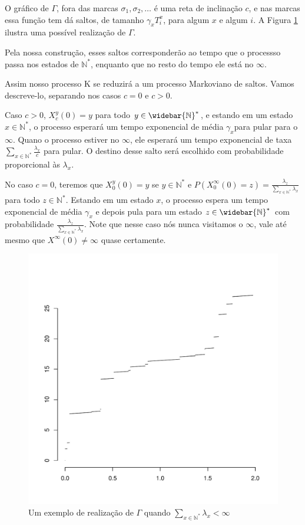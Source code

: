 \documentclass[11pt,twoside,a4paper]{article}
\newcommand{\Nz}{{\mathbb{N^*}}}
\newcommand{\Nzb}{{\mathbb{\widebar{N}^*}}}
\begin{document}
O gráfico de $\Gamma$, fora das marcas $\sigma_1, \sigma_2,
\ldots$ é uma reta de inclinação $c$, e nas marcas
essa função tem dá saltos, de tamanho $\gamma_x T^x_i$, para algum $x$
e algum $i$. A Figura \ref{fig:graf_gamma} ilustra uma possível
realização de $\Gamma$.


Pela nossa construção, esses saltos corresponderão ao tempo que o
processso passa nos estados de $\Nz$, enquanto que no resto do tempo
ele está no $\infty$.

Assim nosso processo K se reduzirá a um processo Markoviano de
saltos. Vamos descreve-lo, separando nos casos $c = 0$ e $c > 0$.

Caso $c > 0$, $X^y_c(0) = y$ para todo $y \in \Nzb$, e estando em um
estado $x \in \Nz$, o processo esperará um tempo exponencial de média
$\gamma_x$para pular para o $\infty$.
Quano o processo estiver no $\infty$, ele esperará um tempo
exponencial de taxa $\sum_{x \in \Nz} \frac{\lambda_x}{c}$ para
pular. O destino desse salto será escolhido com probabilidade
proporcional às $\lambda_x$.

No caso $c=0$, teremos que $X^y_0(0) = y$ se $y \in \Nz$ e
$P(X^\infty_0(0) = z) = \frac{\lambda_z}{\sum_{x\in\Nz} \lambda_x}$
para todo $z \in \Nz$.  Estando em um estado $x$, o processo espera um
tempo exponencial de média $\gamma_x$ e depois pula para um estado $z
\in \Nzb$ com probabilidade $\frac{\lambda_z}{\sum_{x\in\Nz}
  \lambda_x}$.  Note que nesse caso nós nunca visitamos o $\infty$,
vale até mesmo que $X^\infty(0) \neq \infty$ quase certamente.


\begin{figure}
  \centering
  \includegraphics[width=.80\textwidth]{graf_gamma}
  \caption{Um exemplo de realização de $\Gamma$ quando $\sum_{x \in
      \Nz} \lambda_x < \infty$}
  \label{fig:graf_gamma}
\end{figure}
\end{document}
